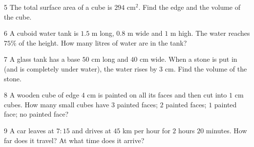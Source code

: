 \gap
\begin{probbox}{5}{\relax}
The total surface area of a cube is $294$ cm$^2$. Find the edge and the volume of the cube.
\end{probbox}
\gap
\begin{probbox}{6}{\relax}
A cuboid water tank is $1.5$ m long, $0.8$ m wide and $1$ m high. The water reaches $75\%$ of the height. How many litres of water are in the tank?
\end{probbox}
\gap
\begin{probbox}{7}{\relax}
A glass tank has a base $50$ cm long and $40$ cm wide. When a stone is put in (and is completely under water), the water rises by $3$ cm. Find the volume of the stone.
\end{probbox}
\gap
\begin{probbox}{8}{\relax}
A wooden cube of edge $4$ cm is painted on all its faces and then cut into $1$ cm cubes. How many small cubes have  $3$ painted faces;  $2$ painted faces;  $1$ painted face;  no painted face?
\end{probbox}
\gap
\begin{probbox}{9}{\relax}
A car leaves at $7{:}15$ and drives at $45$ km per hour for $2$ hours $20$ minutes.  How far does it travel?  At what time does it arrive?
\end{probbox}
